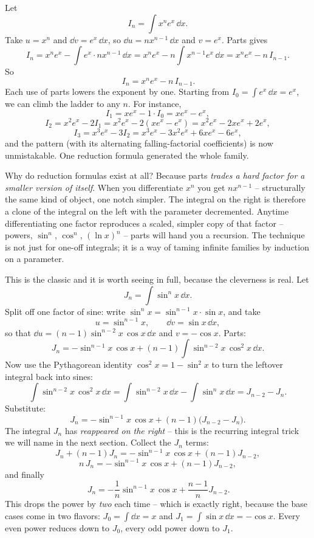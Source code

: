 \begin{example}
\label{ch23:ex-redxn}
Let
\[
I_n = \int x^n e^x\,\dd x.
\]
Take $u = x^n$ and $\dd v = e^x\,\dd x$, so $\dd u = n x^{n-1}\,\dd x$ and
$v = e^x$. Parts gives
\[
I_n = x^n e^x - \int e^x \cdot n x^{n-1}\,\dd x
= x^n e^x - n\int x^{n-1}e^x\,\dd x = x^n e^x - n\,I_{n-1}.
\]
So
\[
\boxed{\,I_n = x^n e^x - n\,I_{n-1}.}
\]
Each use of parts lowers the exponent by one. Starting from
$I_0 = \int e^x\,\dd x = e^x$, we can climb the ladder to any $n$. For instance,
\[
I_1 = x e^x - 1\cdot I_0 = xe^x - e^x,
\]
\[
I_2 = x^2 e^x - 2 I_1 = x^2 e^x - 2(xe^x - e^x) = x^2 e^x - 2x e^x + 2e^x,
\]
\[
I_3 = x^3 e^x - 3 I_2 = x^3 e^x - 3x^2 e^x + 6x e^x - 6 e^x,
\]
and the pattern (with its alternating falling-factorial coefficients) is now
unmistakable. One reduction formula generated the whole family.
\end{example}

\begin{whybox}
Why do reduction formulas exist at all? Because parts \emph{trades a hard factor
for a smaller version of itself}. When you differentiate $x^n$ you get
$n x^{n-1}$ -- structurally the same kind of object, one notch simpler. The
integral on the right is therefore a clone of the integral on the left with the
parameter decremented. Anytime differentiating one factor reproduces a scaled,
simpler copy of that factor -- powers, $\sin^n$, $\cos^n$, $(\ln x)^n$ -- parts
will hand you a recursion. The technique is not just for one-off integrals; it is
a way of taming infinite families by induction on a parameter.
\end{whybox}

\begin{example}
\label{ch23:ex-redsin}
This is the classic and it is worth seeing in full, because the cleverness is
real. Let
\[
J_n = \int \sin^n x\,\dd x.
\]
Split off one factor of sine: write $\sin^n x = \sin^{n-1}x\cdot \sin x$, and take
\[
u = \sin^{n-1}x, \qquad \dd v = \sin x\,\dd x,
\]
so that $\dd u = (n-1)\sin^{n-2}x\,\cos x\,\dd x$ and $v = -\cos x$. Parts:
\[
J_n = -\sin^{n-1}x\,\cos x + (n-1)\int \sin^{n-2}x\,\cos^2 x\,\dd x.
\]
Now use the Pythagorean identity $\cos^2 x = 1 - \sin^2 x$ to turn the leftover
integral back into sines:
\[
\int \sin^{n-2}x\,\cos^2 x\,\dd x
= \int \sin^{n-2}x\,\dd x - \int \sin^{n}x\,\dd x = J_{n-2} - J_n.
\]
Substitute:
\[
J_n = -\sin^{n-1}x\,\cos x + (n-1)\big(J_{n-2} - J_n\big).
\]
The integral $J_n$ has \emph{reappeared on the right} -- this is the recurring
integral trick we will name in the next section. Collect the $J_n$ terms:
\[
J_n + (n-1)J_n = -\sin^{n-1}x\,\cos x + (n-1)J_{n-2},
\]
\[
n\,J_n = -\sin^{n-1}x\,\cos x + (n-1)J_{n-2},
\]
and finally
\[
\boxed{\,J_n = -\frac{1}{n}\sin^{n-1}x\,\cos x + \frac{n-1}{n}J_{n-2}.}
\]
This drops the power by \emph{two} each time -- which is exactly right, because
the base cases come in two flavors: $J_0 = \int \dd x = x$ and
$J_1 = \int \sin x\,\dd x = -\cos x$. Every even power reduces down to $J_0$,
every odd power down to $J_1$.
\end{example}

